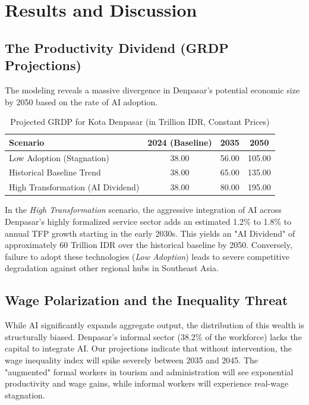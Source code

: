 \documentclass[11pt, a4paper]{article}
\begin{document}
  \section{Results and Discussion}
  
  \subsection{The Productivity Dividend (GRDP Projections)}
  The modeling reveals a massive divergence in Denpasar's potential economic size by 2050 based on the rate of AI adoption. 

\begin{table}[h]
\centering
\caption{Projected GRDP for Kota Denpasar (in Trillion IDR, Constant Prices)}
\vspace{0.2cm}
\begin{tabular}{@{}lccc@{}}
\toprule
\textbf{Scenario} & \textbf{2024 (Baseline)} & \textbf{2035} & \textbf{2050} \\ \midrule
Low Adoption (Stagnation) & 38.00 & 56.00 & 105.00 \\
Historical Baseline Trend & 38.00 & 65.00 & 135.00 \\
High Transformation (AI Dividend) & 38.00 & 80.00 & 195.00 \\ \bottomrule
\end{tabular}
\end{table}

In the \textit{High Transformation} scenario, the aggressive integration of AI across Denpasar's highly formalized service sector adds an estimated 1.2\% to 1.8\% to annual TFP growth starting in the early 2030s. This yields an "AI Dividend" of approximately 60 Trillion IDR over the historical baseline by 2050. Conversely, failure to adopt these technologies (\textit{Low Adoption}) leads to severe competitive degradation against other regional hubs in Southeast Asia.
  
  \subsection{Wage Polarization and the Inequality Threat}
  While AI significantly expands aggregate output, the distribution of this wealth is structurally biased. Denpasar's informal sector (38.2\% of the workforce) lacks the capital to integrate AI. Our projections indicate that without intervention, the wage inequality index will spike severely between 2035 and 2045. The "augmented" formal workers in tourism and administration will see exponential productivity and wage gains, while informal workers will experience real-wage stagnation.
\end{document}
